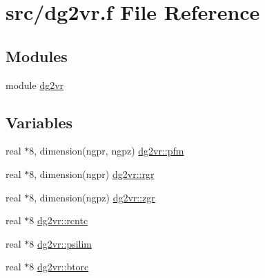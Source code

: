 \hypertarget{dg2vr_8f}{
\section{src/dg2vr.f File Reference}
\label{dg2vr_8f}
}
\subsection*{Modules}
\begin{CompactItemize}
\item 
module \hyperlink{namespacedg2vr}{dg2vr}
\end{CompactItemize}
\subsection*{Variables}
\begin{CompactItemize}
\item 
real $\ast$8, dimension(ngpr, ngpz) \hyperlink{namespacedg2vr_1c53776a0c0432175658661a3696b407}{dg2vr::pfm}
\item 
real $\ast$8, dimension(ngpr) \hyperlink{namespacedg2vr_e39029b9c09d0a13620dd230984b8d91}{dg2vr::rgr}
\item 
real $\ast$8, dimension(ngpz) \hyperlink{namespacedg2vr_63bad1fd77a22251a8b6b79dbb51cf1f}{dg2vr::zgr}
\item 
real $\ast$8 \hyperlink{namespacedg2vr_aad7054333b6de374c00b4a621404770}{dg2vr::rcntc}
\item 
real $\ast$8 \hyperlink{namespacedg2vr_1ee5b4e2b358ea098d87fd41949e2c35}{dg2vr::psilim}
\item 
real $\ast$8 \hyperlink{namespacedg2vr_e4444ade57f6c4463aa02598cdb184af}{dg2vr::btorc}
\end{CompactItemize}
